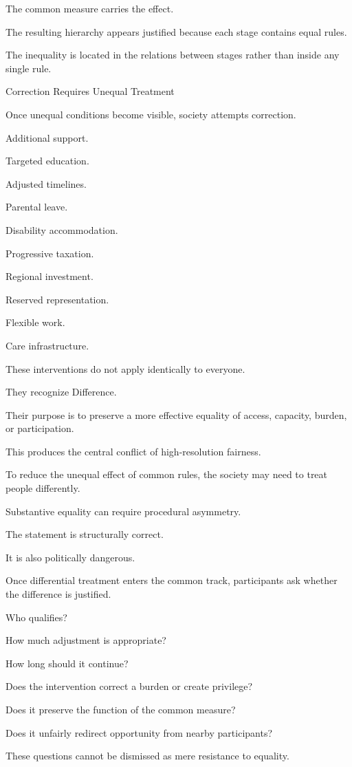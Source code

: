The common measure carries the effect.

The resulting hierarchy appears justified because each stage contains equal rules.

The inequality is located in the relations between stages rather than inside any single rule.

Correction Requires Unequal Treatment

Once unequal conditions become visible, society attempts correction.

Additional support.

Targeted education.

Adjusted timelines.

Parental leave.

Disability accommodation.

Progressive taxation.

Regional investment.

Reserved representation.

Flexible work.

Care infrastructure.

These interventions do not apply identically to everyone.

They recognize Difference.

Their purpose is to preserve a more effective equality of access, capacity, burden, or participation.

This produces the central conflict of high-resolution fairness.

To reduce the unequal effect of common rules, the society may need to treat people differently.

Substantive equality can require procedural asymmetry.

The statement is structurally correct.

It is also politically dangerous.

Once differential treatment enters the common track, participants ask whether the difference is justified.

Who qualifies?

How much adjustment is appropriate?

How long should it continue?

Does the intervention correct a burden or create privilege?

Does it preserve the function of the common measure?

Does it unfairly redirect opportunity from nearby participants?

These questions cannot be dismissed as mere resistance to equality.

